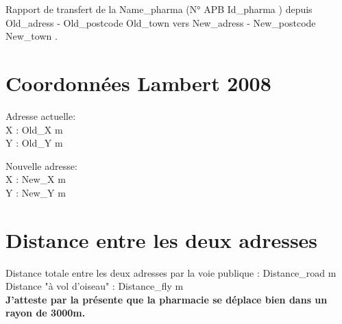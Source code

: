 \documentclass[11pt]{article}
\begin{document}
\vspace{10mm}

Rapport de transfert de la {{ Name_pharma }} (N° APB {{ Id_pharma }}) depuis {{ Old_adress }}- {{ Old_postcode }} {{ Old_town }} vers {{ New_adress }} - {{ New_postcode }} {{ New_town }}.

\vspace{25mm}

\section*{Coordonnées Lambert 2008}
\begin{minipage}{0.5\linewidth}
Adresse actuelle: \\
X : {{ Old_X }} m \\
Y : {{ Old_Y }} m \\
\end{minipage}
\hfill
\begin{minipage}{0.5\linewidth}
    Nouvelle adresse:\\
    X : {{ New_X }} m\\
    Y : {{ New_Y }} m\\
\end{minipage}

\vspace{10mm}

\section*{Distance entre les deux adresses}


\noindent Distance totale entre les deux adresses par la voie publique : {{ Distance_road }} m\\

\noindent Distance "à vol d'oiseau" : {{ Distance_fly }} m\\

\vspace{25mm}
\noindent \textbf{\large J'atteste par la présente que la pharmacie se déplace bien dans un rayon de 3000m.}\\

\vspace{25mm}
\end{document}
